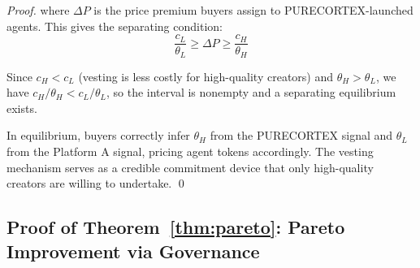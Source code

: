 \begin{proof}
where $\Delta P$ is the price premium buyers assign to PURECORTEX-launched
agents. This gives the separating condition:
\begin{equation}
  \frac{c_L}{\theta_L} \geq \Delta P \geq \frac{c_H}{\theta_H}
\end{equation}

Since $c_H < c_L$ (vesting is less costly for high-quality creators) and
$\theta_H > \theta_L$, we have $c_H / \theta_H < c_L / \theta_L$, so the
interval is nonempty and a separating equilibrium exists.

In equilibrium, buyers correctly infer $\theta_H$ from the PURECORTEX signal
and $\theta_L$ from the Platform A signal, pricing agent tokens accordingly.
The vesting mechanism serves as a credible commitment device that only
high-quality creators are willing to undertake. \qed
\end{proof}

\subsection{Proof of Theorem~\ref{thm:pareto}: Pareto Improvement via Governance}

